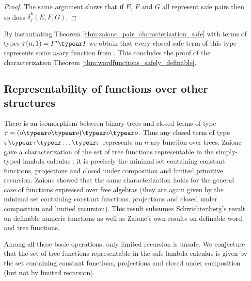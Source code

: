 \begin{proof}
  The same argument shows that if $E$, $F$ and $G$ all represent safe pairs
then so does $\overline \delta^k_j (E,F,G)$.
\end{proof}


By instantiating Theorem \ref{thm:zaionc_pair_characterization_safe}
with terms of types $\tau(n,1) = I^n\typear I$ we obtain that every
closed safe term of this type represents some $n$-ary function from
\safedefset. This concludes the proof of the characterization
Theorem \ref{thm:wordfunctions_safely_definable}.


\subsection{Representability of functions over other structures}\hfill

There is an isomorphism between binary trees and closed terms of
type $\tau =(o\typear o\typear o) \typear o \typear o$. Thus any
closed term of type $\tau\typear\tau \typear \ldots \typear \tau $
represents an $n$-ary function over trees. Zaionc gave a
characterization of the set of tree functions representable in the
simply-typed lambda calculus \cite{DBLP:conf/aluacs/Zaionc88}: it is
precisely the minimal set containing constant functions, projections
and closed under composition and limited primitive recursion. Zaionc
showed that the same characterization holds for the general case of
functions expressed over free algebras
\cite{DBLP:journals/apal/Zaionc91} (they are again given by the
minimal set containing constant functions, projections and closed
under composition and limited recursion). This result subsumes
Schwichtenberg's result on definable numeric functions as well as
Zaionc's own results on definable word and tree functions.

Among all these basic operations, only limited recursion is unsafe.
We conjecture that the set of tree functions representable in the
safe lambda calculus is given by the set containing constant
functions, projections and closed under composition (but not by
limited recursion).
